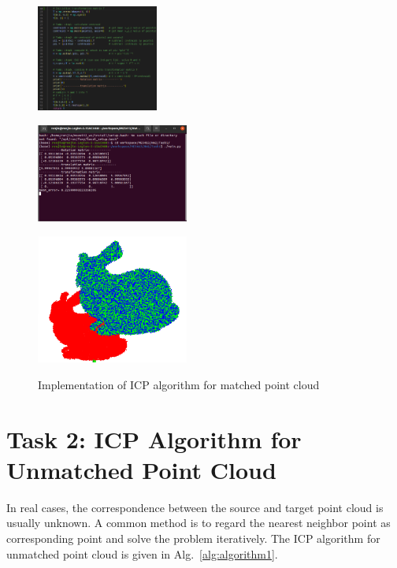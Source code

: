 \documentclass[hyperref]{article}
\theoremstyle{nonumberplain}
\begin{document}
\begin{figure}[H]
	\centering
	\begin{minipage}[t]{0.32\textwidth}
		\centering
		\includegraphics[width=4cm]{1_code.png}
		\label{fig1a}
	\end{minipage}
	\begin{minipage}[t]{0.32\textwidth}
		\centering
		\includegraphics[width=5cm]{1_T.png}
		\label{fig1b}
	\end{minipage}
	\begin{minipage}[t]{0.32\textwidth}
		\centering
		\includegraphics[width=5cm]{1_result.png}
		\label{fig1c}
	\end{minipage}
	\caption{Implementation of ICP algorithm for matched point cloud}
	\label{fig1}
\end{figure} 


\section{Task 2: ICP Algorithm for Unmatched Point Cloud}

\hspace{1.0em}

In real cases, the correspondence between the source and target point cloud is usually unknown. A common method is to regard the nearest neighbor point as corresponding point and solve the problem iteratively. The ICP algorithm for unmatched point cloud is given in Alg.~\ref{alg:algorithm1}.
\end{document}

